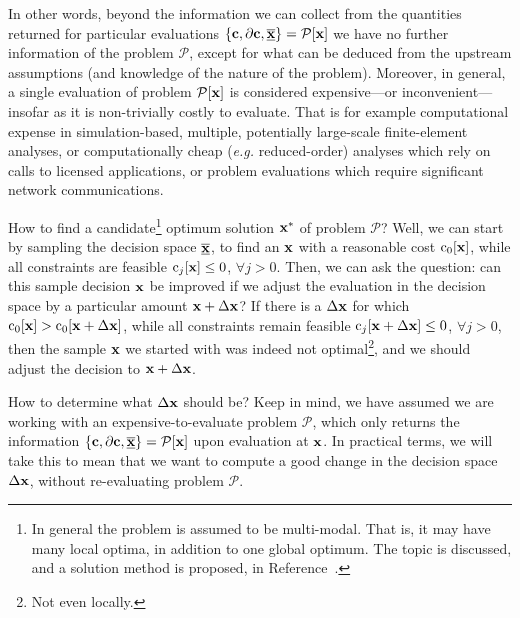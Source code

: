 \documentclass[11pt]{article}
\begin{document}
In other words, beyond the information we can collect from the quantities returned for particular evaluations $\left\{\mathbf{c}, \partial \mathbf{c}, \underline{\overline{\mathbf{x}}}\right\}=\mathcal{P}[\mathbf{x}]$ we have no further information of the problem $\mathcal{P}$, except for what can be deduced from the upstream assumptions (and knowledge of the nature of the problem). Moreover, in general, a single evaluation of problem $\mathcal{P}[\mathbf{x}]$ is considered expensive---or inconvenient---insofar as it is non-trivially costly to evaluate. That is for example computational expense in simulation-based, multiple, potentially large-scale finite-element analyses, or computationally cheap (\emph{e.g.} reduced-order) analyses which rely on calls to licensed applications, or problem evaluations which require significant network communications.

How to find a candidate\footnote{In general the problem is assumed to be multi-modal. That is, it may have many local optima, in addition to one global optimum. The topic is discussed, and a solution method is proposed, in Reference~\cite{munro2022}.} optimum solution $\mathbf{x}^\ast$ of problem $\mathcal{P}$?  Well, we can start by sampling the decision space $\underline{\overline{\mathbf{x}}}$, to find an $\mathbf{x}$ with a reasonable cost $\textrm{c}_0 [\mathbf{x}]$, while all constraints are feasible $\textrm{c}_j [\mathbf{x}] \leq 0$, $\forall j > 0$. Then, we can ask the question: can this sample decision $\mathbf{x}$ be improved if we adjust the evaluation in the decision space by a particular amount $\mathbf{x} + \Delta \mathbf{x}$? If there is a $\Delta \mathbf{x}$ for which $\textrm{c}_0 [\mathbf{x}] > \textrm{c}_0 [\mathbf{x} + \Delta\mathbf{x}]$, while all constraints remain feasible $\textrm{c}_j [\mathbf{x} + \Delta \mathbf{x}] \leq 0$, $\forall j > 0$, then the sample $\mathbf{x}$ we started with was indeed not optimal\footnote{Not even locally.}, and we should adjust the decision to $\mathbf{x} + \Delta \mathbf{x}$.

How to determine what $\Delta \mathbf{x}$ should be? Keep in mind, we have assumed we are working with an expensive-to-evaluate problem $\mathcal{P}$, which only returns the information $\left\{\mathbf{c}, \partial \mathbf{c}, \underline{\overline{\mathbf{x}}}\right\}=\mathcal{P}[\mathbf{x}]$ upon evaluation at $\mathbf{x}$. In practical terms, we will take this to mean that we want to compute a good change in the decision space $\Delta \mathbf{x}$, without re-evaluating problem $\mathcal{P}$.
\end{document}
